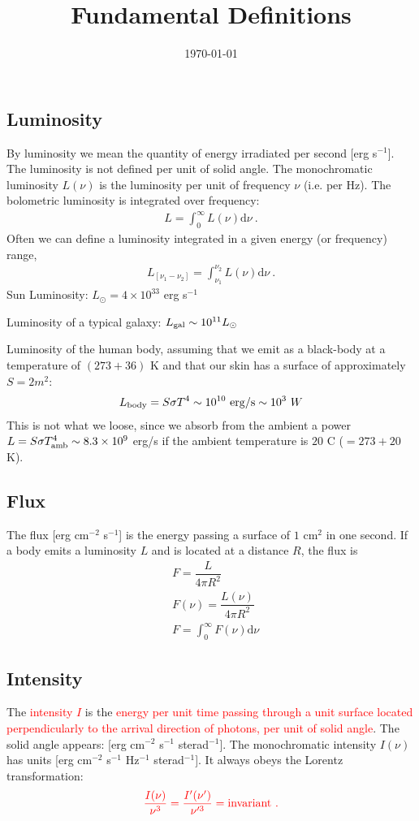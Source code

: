 \documentclass[12pt,a4paper]{article}
\title{Fundamental Definitions}
\author{}
\date{\today}
\newcommand{\dif}{\mathrm{d}}
\begin{document}
\maketitle

\subsection{Luminosity}
\cite{2013LNP...873.....G} By luminosity we mean the quantity of energy irradiated per second [erg s$^{-1}$]. The luminosity is not defined per unit of solid angle. The monochromatic luminosity $L(\nu)$ is the luminosity per unit of frequency $\nu$ (i.e. per Hz). The bolometric luminosity is integrated over frequency:
\begin{align}
L = \int_0^\infty L(\nu) \dif \nu ~.
\end{align}
Often we can define a luminosity integrated in a given energy (or frequency) range,
\begin{align}
L_{[\nu_1-\nu_2]} = \int_{\nu_1}^{\nu_2} L(\nu) \dif \nu ~.
\end{align}
Sun Luminosity: $L_\odot = 4 \times 10^{33}$ erg s$^{-1}$

Luminosity of a typical galaxy: $L_{\rm gal} \sim 10^{11} L_\odot$

Luminosity of the human body, assuming that we emit as a black-body at a temperature of $(273 + 36)$ K and that our skin has a surface of approximately $S = 2 m^2$:
\begin{align}
L_{\rm body} = S \sigma T^4 \sim 10^{10} ~{\rm erg/s} \sim 10^3~ W 
\end{align}
This is not what we loose, since we absorb from the ambient a power $L = S \sigma T_{\rm amb}^4 \sim 8.3 \times 10^9$ erg/s if the ambient temperature is $20$ C ($=273 + 20$ K).


\subsection{Flux}
The flux [erg cm$^{-2}$ s$^{-1}$] is the energy passing a surface of $1$ cm$^2$ in one second. If a body emits a luminosity $L$ and is located at a distance $R$, the flux is
\begin{align}
& F = \dfrac{L}{4\pi R^2} \\
& F(\nu) = \dfrac{L(\nu)}{4\pi R^2} \\
& F = \int_0^\infty F(\nu) \dif \nu
\end{align}

\subsection{Intensity}
The \textcolor{red}{intensity $I$} is the \textcolor{red}{energy per unit time passing through a unit surface located perpendicularly to the arrival direction of photons, per unit of solid angle}. The solid angle appears: [erg cm$^{-2}$ s$^{-1}$ sterad$^{-1}$]. The monochromatic intensity $I (\nu)$ has units [erg cm$^{-2}$ s$^{-1}$ Hz$^{-1}$ sterad$^{-1}$]. It always obeys the Lorentz transformation:
\begin{align}
\color{red} \dfrac{I(\nu)}{\nu^3} = \dfrac{I^\prime(\nu^\prime)}{\nu^{\prime 3} } = \rm invariant ~.
\end{align}
\end{document}
